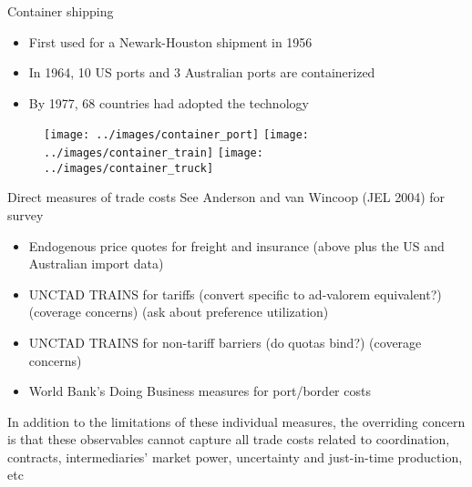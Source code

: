 \documentclass[10pt,notes=hide,aspectratio=169]{beamer}
\begin{document}
\begin{frame}{Container shipping}
\begin{itemize}
	\item First used for a Newark-Houston shipment in 1956 %
	\item In 1964, 10 US ports and 3 Australian ports are containerized %
	\item By 1977, 68 countries had adopted the technology
\end{itemize}
\begin{center}\begin{figure}
	\texttt{[image: ../images/container\_port]} \hfill
	\texttt{[image: ../images/container\_train]} \hfill
	\texttt{[image: ../images/container\_truck]}
\end{figure}  \end{center}
\end{frame}
\begin{frame}{Direct measures of trade costs}
See Anderson and van Wincoop (JEL 2004) for survey
\begin{itemize}
	\item Endogenous price quotes for freight and insurance (above plus the US and Australian import data)
	\item UNCTAD TRAINS for tariffs (convert specific to ad-valorem equivalent?) (coverage concerns) (ask about preference utilization)
	\item UNCTAD TRAINS for non-tariff barriers (do quotas bind?) (coverage concerns)
	\item World Bank's Doing Business measures for port/border costs
\end{itemize}
In addition to the limitations of these individual measures,
the overriding concern is that these observables cannot capture all trade costs related to coordination, contracts, intermediaries' market power, uncertainty and just-in-time production, etc
\end{frame}
\end{document}
